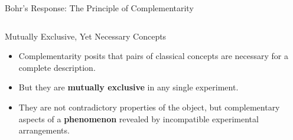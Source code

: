 \begin{frame}{Bohr's Response: The Principle of Complementarity}

  \begin{columns}[T] %
    \begin{column}{0.55\textwidth}
      \begin{block}{Mutually Exclusive, Yet Necessary Concepts}
        \begin{itemize}[<+->] %
          \item Complementarity posits that pairs of classical concepts are necessary for a complete description.
          \item But they are \textbf{mutually exclusive} in any single experiment.
          \item They are not contradictory properties of the object, but complementary aspects of a \textbf{phenomenon} revealed by incompatible experimental arrangements.
        \end{itemize}
    \end{block}
    \end{column}


\end{columns}
\end{frame}
